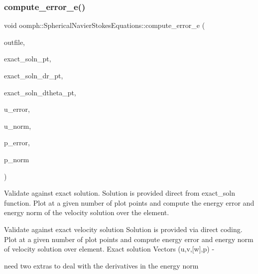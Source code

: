 \mbox{\label{classoomph_1_1SphericalNavierStokesEquations_a18ac628bb3e32faa0a24182159fd7cea}} 
\subsubsection{\texorpdfstring{compute\+\_\+error\+\_\+e()}{compute\_error\_e()}}
{\footnotesize\ttfamily void oomph\+::\+Spherical\+Navier\+Stokes\+Equations\+::compute\+\_\+error\+\_\+e (\begin{DoxyParamCaption}\item[{std\+::ostream \&}]{outfile,  }\item[{\hyperlink{classoomph_1_1FiniteElement_a690fd33af26cc3e84f39bba6d5a85202}{Finite\+Element\+::\+Steady\+Exact\+Solution\+Fct\+Pt}}]{exact\+\_\+soln\+\_\+pt,  }\item[{\hyperlink{classoomph_1_1FiniteElement_a690fd33af26cc3e84f39bba6d5a85202}{Finite\+Element\+::\+Steady\+Exact\+Solution\+Fct\+Pt}}]{exact\+\_\+soln\+\_\+dr\+\_\+pt,  }\item[{\hyperlink{classoomph_1_1FiniteElement_a690fd33af26cc3e84f39bba6d5a85202}{Finite\+Element\+::\+Steady\+Exact\+Solution\+Fct\+Pt}}]{exact\+\_\+soln\+\_\+dtheta\+\_\+pt,  }\item[{double \&}]{u\+\_\+error,  }\item[{double \&}]{u\+\_\+norm,  }\item[{double \&}]{p\+\_\+error,  }\item[{double \&}]{p\+\_\+norm }\end{DoxyParamCaption})}

Validate against exact solution. Solution is provided direct from exact\+\_\+soln function. Plot at a given number of plot points and compute the energy error and energy norm of the velocity solution over the element.

Validate against exact velocity solution Solution is provided via direct coding. Plot at a given number of plot points and compute energy error and energy norm of velocity solution over element. Exact solution Vectors (u,v,\mbox{[}w\mbox{]},p) -\/
\begin{DoxyItemize}
\item need two extras to deal with the derivatives in the energy norm 
\end{DoxyItemize}

